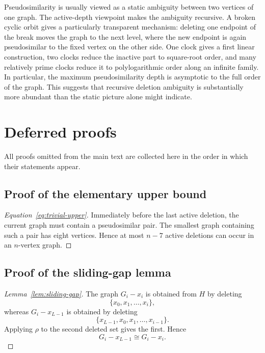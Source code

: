 \documentclass[11pt]{article}
\theoremstyle{definition}
\theoremstyle{remark}
\begin{document}
Pseudosimilarity is usually viewed as a static ambiguity between two vertices of one graph. The active-depth viewpoint makes the ambiguity recursive. A broken cyclic orbit gives a particularly transparent mechanism: deleting one endpoint of the break moves the graph to the next level, where the new endpoint is again pseudosimilar to the fixed vertex on the other side. One clock gives a first linear construction, two clocks reduce the inactive part to square-root order, and many relatively prime clocks reduce it to polylogarithmic order along an infinite family. In particular, the maximum pseudosimilarity depth is asymptotic to the full order of the graph. This suggests that recursive deletion ambiguity is substantially more abundant than the static picture alone might indicate.

\clearpage
\appendix
\section{Deferred proofs}\label{app:proofs}

All proofs omitted from the main text are collected here in the order in which their statements appear.

\subsection{Proof of the elementary upper bound}\label{app:upper-bound}

\begin{proof}[Equation~\eqref{eq:trivial-upper}]
Immediately before the last active deletion, the current graph must contain a pseudosimilar pair.  The smallest graph containing such a pair has eight vertices.  Hence at most $n-7$ active deletions can occur in an $n$-vertex graph.
\end{proof}

\subsection{Proof of the sliding-gap lemma}\label{app:sliding-gap}

\begin{proof}[Lemma~\ref{lem:sliding-gap}]
The graph $G_i-x_i$ is obtained from $H$ by deleting
\[
    \{x_0,x_1,\ldots,x_i\},
\]
whereas $G_i-x_{L-1}$ is obtained by deleting
\[
    \{x_{L-1},x_0,x_1,\ldots,x_{i-1}\}.
\]
Applying $\rho$ to the second deleted set gives the first. Hence
\[
    G_i-x_{L-1}\cong G_i-x_i.
\]
\end{proof}
\end{document}
